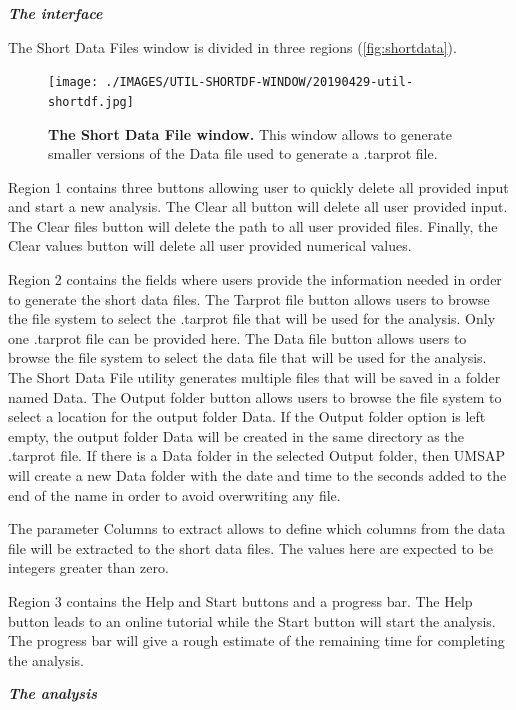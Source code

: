 \textit{\textbf{The interface}}

The Short Data Files window is divided in three regions (\autoref{fig:shortdata}).

\begin{figure}[h]
	\centering
	\texttt{[image: ./IMAGES/UTIL-SHORTDF-WINDOW/20190429-util-shortdf.jpg]}	    
	\caption[The Short Data File window]{\textbf{The Short Data File window.} This window allows to generate smaller versions of the Data file used to generate a .tarprot file.} 
	\label{fig:shortdata}
	\vspace{-5pt} 	
\end{figure} 

Region \num{1} contains three buttons allowing user to quickly delete all provided input and start a new analysis. The Clear all button will delete all user provided input. The Clear files button will delete the path to all user provided files. Finally, the Clear values button will delete all user provided numerical values.

Region \num{2} contains the fields where users provide the information needed in order to generate the short data files. The Tarprot file button allows users to browse the file system to select the .tarprot file that will be used for the analysis. Only one .tarprot file can be provided here. The Data file button allows users to browse the file system to select the data file that will be used for the analysis. The Short Data File utility generates multiple files that will be saved in a folder named Data. The Output folder button allows users to browse the file system to select a location for the output folder Data. If the Output folder option is left empty, the output folder Data will be created in the same directory as the .tarprot file. If there is a Data folder in the selected Output folder, then UMSAP will create a new Data folder with the date and time to the seconds added to the end of the name in order to avoid overwriting any file. 

The parameter Columns to extract allows to define which columns from the data file will be extracted to the short data files. The values here are expected to be integers greater than zero.

Region \num{3} contains the Help and Start buttons and a progress bar. The Help button leads to an online tutorial while the Start button will start the analysis. The progress bar will give a rough estimate of the remaining time for completing the analysis.

\textit{\textbf{The analysis}}

